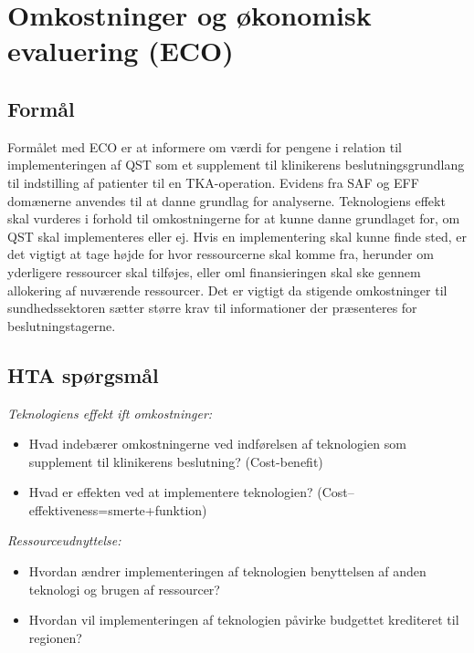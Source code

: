 \section{Omkostninger og økonomisk evaluering (ECO)}
\subsection{Formål}
Formålet med ECO er at informere om værdi for pengene i relation til implementeringen af QST som et supplement til klinikerens beslutningsgrundlang til indstilling af patienter til en TKA-operation. Evidens fra SAF og EFF domænerne anvendes til at danne grundlag for analyserne. Teknologiens effekt skal vurderes i forhold til omkostningerne for at kunne danne grundlaget for, om QST skal implementeres eller ej. Hvis en implementering skal kunne finde sted, er det vigtigt at tage højde for hvor ressourcerne skal komme fra, herunder om yderligere ressourcer skal tilføjes, eller oml finansieringen skal ske gennem allokering af nuværende ressourcer. Det er vigtigt da stigende omkostninger til sundhedssektoren sætter større krav til informationer der præsenteres for beslutningstagerne.
\subsection{HTA spørgsmål}
\textit{Teknologiens effekt ift omkostninger:}
\begin{itemize}
	\item Hvad indebærer omkostningerne ved indførelsen af teknologien som supplement til klinikerens beslutning? (Cost-benefit) %
	\item Hvad er effekten ved at implementere teknologien? (Cost–effektiveness=smerte+funktion) %
\end{itemize}

\textit{Ressourceudnyttelse:}
\begin{itemize}
	\item Hvordan ændrer implementeringen af teknologien benyttelsen af anden teknologi og brugen af ressourcer?%
	\item Hvordan vil implementeringen af teknologien påvirke budgettet krediteret til regionen? %
\end{itemize}

